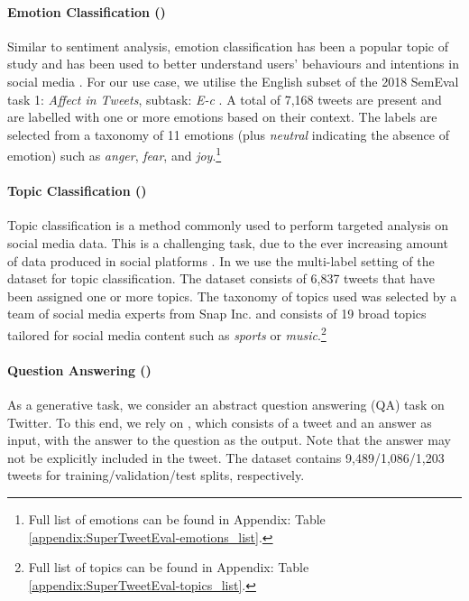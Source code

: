 \paragraph{Emotion Classification ({\TweetEmotion})} Similar to sentiment analysis, emotion classification has been a popular topic of study \cite{kuvsen2017identifying, he2016exploring} and has been used to better understand users' behaviours and intentions in social media \cite{son2022emotion, corbett2022tweets}. For our use case, we utilise the English subset of the 2018 SemEval task 1: \textit{Affect in Tweets}, subtask: \textit{E-c}  \cite{mohammad2018semeval}. A total of 7,168 tweets are present and are labelled with one or more emotions based on their context. The labels are selected from a taxonomy of 11 emotions (plus \textit{neutral} indicating the absence of emotion) such as \textit{anger}, \textit{fear}, and \textit{joy}.\footnote{Full list of emotions can be found in Appendix: Table \ref{appendix:SuperTweetEval-emotions_list}.}

\paragraph{Topic Classification ({\TweetTopic})} Topic classification is a method commonly used to perform targeted analysis on social media data. This is a challenging task, due to the ever increasing amount of data produced in social platforms \cite{weller2015accepting, stieglitz2018social}. In {\DATASET} we use the multi-label setting of the {\TweetTopic} dataset \cite{antypas2022twitter} for topic classification. The dataset consists of 6,837 tweets that have been assigned one or more topics. The taxonomy of topics used was selected by a team of social media experts from Snap Inc. and consists of 19 broad topics tailored for social media content such as \textit{sports} or \textit{music}.\footnote{Full list of topics can be found in Appendix: Table \ref{appendix:SuperTweetEval-topics_list}.}

\paragraph{Question Answering ({\TweetQA})} As a generative task, we consider an abstract question answering (QA) task on Twitter. To this end, we rely on {\TweetQA} \cite{xiong-etal-2019-tweetqa}, which consists of a tweet and an answer as input, with the answer to the question as the output. Note that the answer may not be explicitly included in the tweet. The dataset contains 9,489/1,086/1,203 tweets for training/validation/test splits, respectively.

